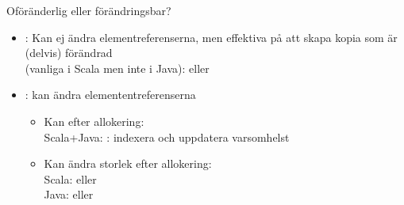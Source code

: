 



\begin{Slide}{Oföränderlig eller förändringsbar?}
\begin{itemize}
\item {}:  Kan ej ändra elementreferenserna, men effektiva på att skapa kopia som är (delvis) förändrad\\(vanliga i Scala men inte i Java):  eller 

\item {}: kan ändra elemententreferenserna
  \begin{itemize} 
  \item Kan  efter allokering: \\ Scala+Java: : indexera och uppdatera varsomhelst
  \item Kan ändra storlek efter allokering: 
  \\ Scala:  eller 
  \\ Java:  eller 
  \end{itemize}
\end{itemize}
\end{Slide}




